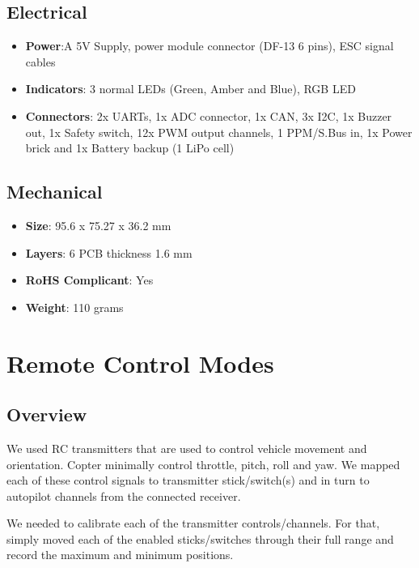 \subsection{Electrical}

\begin{itemize}
	\item \textbf{Power}:A 5V Supply, power module connector (DF-13 6 pins), ESC signal cables
	\item \textbf{Indicators}: 3 normal LEDs (Green, Amber and Blue), RGB LED
	\item \textbf{Connectors}: 2x UARTs, 1x ADC connector, 1x CAN, 3x I2C, 1x Buzzer out, 1x Safety switch, 12x PWM output channels, 1 PPM/S.Bus in, 1x Power brick and 1x Battery backup (1 LiPo cell)
\end{itemize}

\subsection{Mechanical}
\begin{itemize}
	\item \textbf{Size}: 95.6 x 75.27 x 36.2 mm
	\item \textbf{Layers}: 6 PCB thickness 1.6 mm
	\item \textbf{RoHS Complicant}: Yes
	\item \textbf{Weight}: 110 grams
\end{itemize}



\section{Remote Control Modes}
\subsection{Overview}
We used RC transmitters that are used to control vehicle movement and orientation. Copter minimally control throttle, pitch, roll and yaw. We mapped each of these control signals to transmitter stick/switch(s) and in turn to autopilot channels from the connected receiver.

We needed to calibrate each of the transmitter controls/channels. For that, simply moved each of the enabled sticks/switches through their full range and record the maximum and minimum positions.

